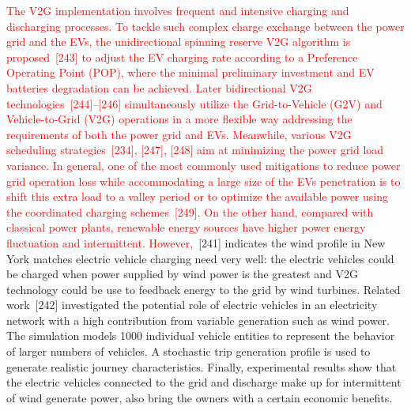 \documentclass[onecolumn]{IEEEconf}
\begin{document}
\begin{description}
\textcolor{red}{The V2G implementation involves frequent and intensive charging and discharging processes. To tackle such complex charge exchange between the power grid and the EVs, the unidirectional spinning reserve V2G algorithm is proposed~[243] to adjust the EV charging rate according to a Preference Operating Point (POP), where the minimal preliminary investment and EV batteries degradation can be achieved.  Later bidirectional V2G technologies~[244]--[246] simultaneously utilize the Grid-to-Vehicle (G2V) and Vehicle-to-Grid (V2G) operations in a more flexible way addressing the requirements of both the power grid and EVs. Meanwhile, various V2G scheduling strategies~[234], [247], [248] aim at minimizing the power grid load variance. In general, one of the most commonly used mitigations to reduce power grid operation loss while accommodating a large size of the EVs penetration is to shift this extra load to a valley period or to optimize the available power using the coordinated charging schemes~[249]. On the other hand, 
compared with classical power plants, renewable energy sources have higher power energy fluctuation and intermittent. However,}~[241] indicates the wind profile in New York matches electric vehicle charging need very well: the electric vehicles could be charged when power supplied by wind power is the greatest and V2G technology could be use to feedback energy to the grid by wind turbines.
Related work~[242] investigated the potential role of electric vehicles in an electricity network with a high contribution from variable generation such as wind power. The simulation models 1000 individual vehicle entities to represent the behavior of larger numbers of vehicles. 
A stochastic trip generation profile is used to generate realistic journey characteristics. 
Finally, experimental results show that the electric vehicles connected to the grid and discharge make up for intermittent of wind generate power, also bring the owners with a certain economic benefits.
\\
\end{description}
\end{document}
